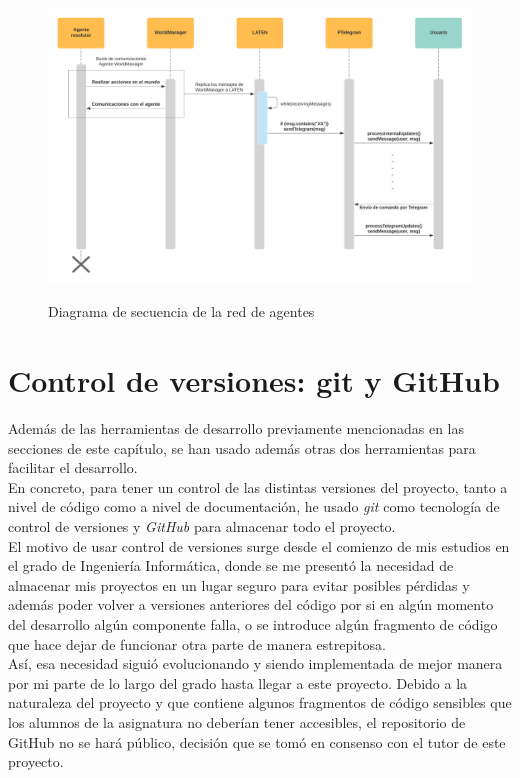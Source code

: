 \begin{figure}[h]
\centering
\includegraphics[width=1.1\textwidth]{logos/secuencia.png}\\[1.4cm]
\caption{Diagrama de secuencia de la red de agentes}
\label{img:secuencia}
\end{figure}

\section{Control de versiones: git y GitHub}

Además de las herramientas de desarrollo previamente mencionadas en las secciones de este capítulo, se han usado además otras dos herramientas para facilitar el desarrollo.\\

En concreto, para tener un control de las distintas versiones del proyecto, tanto a nivel de código como a nivel de documentación, he usado \textit{git} como tecnología de control de versiones y \textit{GitHub} para almacenar todo el proyecto.\\

El motivo de usar control de versiones surge desde el comienzo de mis estudios en el grado de Ingeniería Informática, donde se me presentó la necesidad de almacenar mis proyectos en un lugar seguro para evitar posibles pérdidas y además poder volver a versiones anteriores del código por si en algún momento del desarrollo algún componente falla, o se introduce algún fragmento de código que hace dejar de funcionar otra parte de manera estrepitosa.\\

Así, esa necesidad siguió evolucionando y siendo implementada de mejor manera por mi parte de lo largo del grado hasta llegar a este proyecto. Debido a la naturaleza del proyecto y que contiene algunos fragmentos de código sensibles que los alumnos de la asignatura no deberían tener accesibles, el repositorio de GitHub no se hará público, decisión que se tomó en consenso con el tutor de este proyecto.\\

